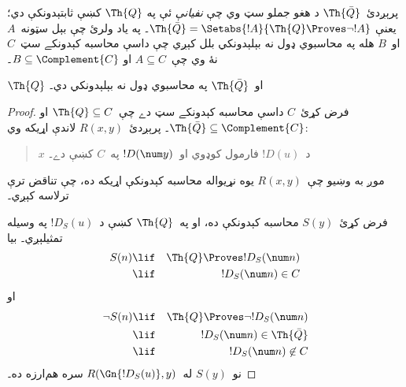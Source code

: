\documentclass[../../../include/open-logic-section]{subfiles}
\begin{document}



پرېږدئ~$\Th{\bar Q}$ د هغو جملو سټ وي چې \emph{نفيانې} ئې په
$\Th{Q}$ کښې ثابتېدونکې دي؛ يعنې
$\Th{\bar Q} = \Setabs{!A}{\Th{Q} \Proves \lnot !A}$۔ په ياد ولرئ
چې بېل سټونه~$A$ او~$B$ هله په محاسبوي ډول نه بېلېدونکي بلل کېږي
چې داسې محاسبه کېدونکے سټ~$C$ نۀ وي چې~$A \subseteq C$ او
$B \subseteq \Complement{C}$۔

\begin{lem}
$\Th{Q}$ او~$\Th{\bar Q}$ په محاسبوي ډول نه بېلېدونکي دي۔
\end{lem}

\begin{proof}
فرض کړئ~$C$ داسې محاسبه کېدونکے سټ دے چې~$\Th{Q} \subseteq C$ او
$\Th{\bar Q} \subseteq \Complement{C}$۔ پرېږدئ~$R(x,y)$ لاندې
اړيکه وي:
\begin{quote}
$x$ د~$!D(u)$ فارمول کوډوي او~$!D(\num y)$ په~$C$ کښې دے۔
\end{quote}
موږ به وښيو چې~$R(x,y)$ يوه نړيواله محاسبه کېدونکې اړيکه ده، چې
تناقض ترې ترلاسه کېږي۔

فرض کړئ~$S(y)$ محاسبه کېدونکې ده، او په~$\Th{Q}$ کښې د~$!D_S(u)$
په وسيله تمثيلېږي۔ بيا
\begin{eqnarray*}
S(n) & \lif & \Th{Q} \Proves !D_S(\num n) \\
& \lif & !D_S(\num n) \in C
\end{eqnarray*}
او
\begin{eqnarray*}
\lnot S(n) & \lif & \Th{Q} \Proves \lnot !D_S(\num n) \\
& \lif & !D_S(\num n) \in \Th{\bar Q} \\
& \lif & !D_S(\num n) \not\in C
\end{eqnarray*}
نو~$S(y)$ له~$R(\Gn{!D_S(u)},y)$ سره هم‌ارزه ده۔
\end{proof}
\end{document}
